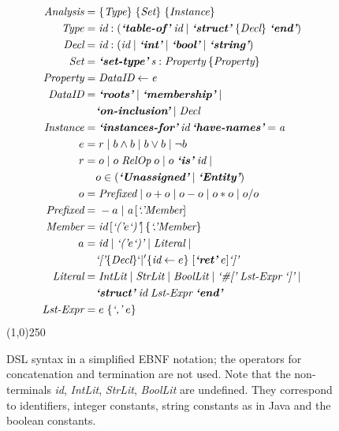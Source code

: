 \begin{figure}[!ht]
\begin{align*}
\textit{Analysis} =&\; \{ \textit{Type} \} \; \{ \textit{Set} \} \; \{ \textit{Instance} \} \\
\textit{Type} =&\; \textit{id}:\left(\textit{\textbf{`table-of'}} \; \textit{id} \;|\; \textit{\textbf{`struct'}} \;  \{ \textit{Decl} \} \; \textit{\textbf{`end'}}\right) \\
\textit{Decl} =&\; \textit{id}: \left( \textit{id} \;|\; \textit{\textbf{`int'}} \;|\; \textit{\textbf{`bool'}} \;|\; \textit{\textbf{`string'}} \right) \\
\textit{Set} =&\; \textit{\textbf{`set-type'}} \: \textit{s} : \textit{Property} \: \{ \textit{Property} \} \\
\textit{Property} =&\; \textit{DataID} \leftarrow \textit{e} \\
\textit{DataID} =&\; \textit{\textbf{`roots'}} \;|\; \textit{\textbf{`membership'}} \;|\; \\   &\textit{\textbf{`on-inclusion'}} \;|\; \textit{Decl}  \\
\textit{Instance} =&\; \textit{\textbf{`instances-for'}} \: \textit{id} \: \textit{\textbf{`have-names'}} = \textit{a} \\
e  =&\; r \;|\; b \land b \;|\; b \lor b \;|\; \neg b \\
r =&\; o \;|\; o \; \textit{RelOp} \; o \;|\; o \; \textit{\textbf{`is'}} \; \textit{id} \;|\;\\ 
	& o \in \left(\textit{\textbf{`Unassigned'}} \;|\; \textit{\textbf{`Entity'}} \right) \\
o =&\; \textit{Prefixed} \;|\; o + o \;|\; o - o \;|\; o * o \;|\; o / o\\
\textit{Prefixed} =&\; -a \;|\; \textit{a} \left[ \textit{`.'} \textit{Member} \right] \\
\textit{Member} =&\; \textit{id} \left[ \textit{`('} {e} \textit{`)'} \right] \{ \textit{`.'} \textit{Member} \} \\
a =&\; \textit{id} \;|\; \textit{`('} e \textit{`)'} \;|\; \textit{Literal} \;|\; \\ 
	&\textit{`['} \{\textit{Decl}\} `|' \{\textit{id} \leftarrow e\} \; [ \textit{\textbf{`ret'}} \; e ] \textit{`]'} \\
\textit{Literal} =&\; \textit{IntLit} \;|\; \textit{StrLit} \;|\; \textit{BoolLit} \;|\; \textit{`\#['} \; \textit{Lst-Expr} \; \textit{`]'} \;|\; \\
				&\textit{\textbf{`struct'}} \; \textit{id} \; \textit{Lst-Expr} \; \textit{\textbf{`end'}} \\
\textit{Lst-Expr} =&\; e \; \{ \textit{`,'} \; e \}
\end{align*}
\line(1,0){250}
\caption{DSL syntax in a simplified EBNF notation; the operators for concatenation and termination are not used.
Note that the non-terminals \textit{id}, \textit{IntLit}, \textit{StrLit}, \textit{BoolLit} are undefined.
They correspond to identifiers, integer constants, string constants as in Java and the boolean constants.}
\label{fig:syntax}
\end{figure}

